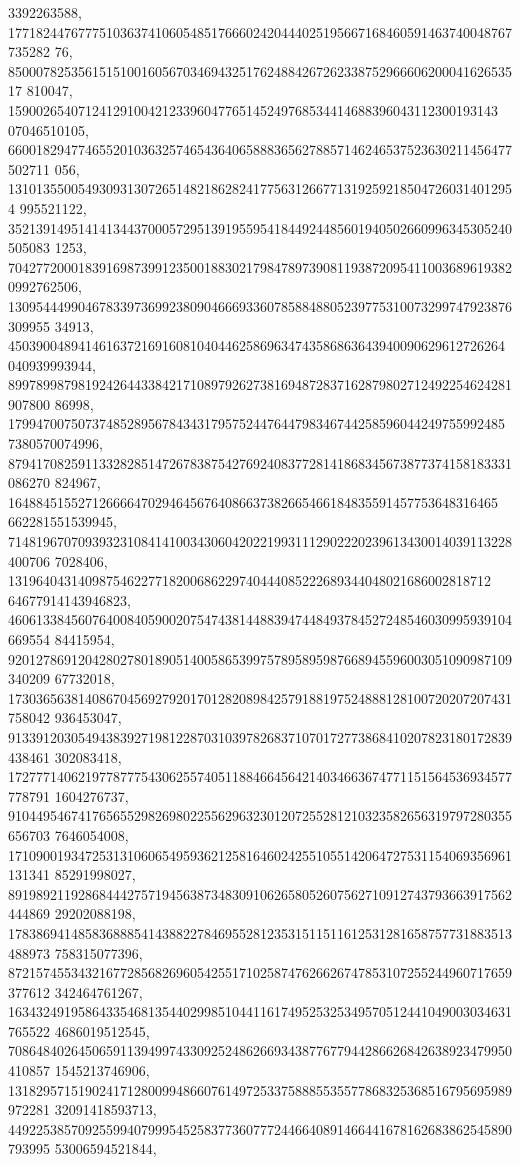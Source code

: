 \documentclass[12pt]{article}
\begin{document}
3392263588, 
177182447677751036374106054851766602420444025195667168460591463740048767735282
76, 85000782535615151001605670346943251762488426726233875296660620004162653517
810047, 1590026540712412910042123396047765145249768534414688396043112300193143
07046510105, 
660018294774655201036325746543640658883656278857146246537523630211456477502711
056, 1310135500549309313072651482186282417756312667713192592185047260314012954
995521122, 
352139149514141344370005729513919559541844924485601940502660996345305240505083
1253, 704277200018391698739912350018830217984789739081193872095411003689619382
0992762506, 
130954449904678339736992380904666933607858848805239775310073299747923876309955
34913, 45039004894146163721691608104044625869634743586863643940090629612726264
040939993944, 
899789987981924264433842171089792627381694872837162879802712492254624281907800
86998, 17994700750737485289567843431795752447644798346744258596044249755992485
7380570074996, 
879417082591133282851472678387542769240837728141868345673877374158183331086270
824967, 1648845155271266664702946456764086637382665466184835591457753648316465
662281551539945, 
714819670709393231084141003430604202219931112902220239613430014039113228400706
7028406, 131964043140987546227718200686229740444085222689344048021686002818712
64677914143946823, 
460613384560764008405900207547438144883947448493784527248546030995939104669554
84415954, 
920127869120428027801890514005865399757895895987668945596003051090987109340209
67732018, 
173036563814086704569279201701282089842579188197524888128100720207207431758042
936453047, 
913391203054943839271981228703103978268371070172773868410207823180172839438461
302083418, 
172777140621977877754306255740511884664564214034663674771151564536934577778791
1604276737, 
910449546741765655298269802255629632301207255281210323582656319797280355656703
7646054008, 
171090019347253131060654959362125816460242551055142064727531154069356961131341
85291998027, 
891989211928684442757194563873483091062658052607562710912743793663917562444869
29202088198, 
178386941485836888541438822784695528123531511511612531281658757731883513488973
758315077396, 
872157455343216772856826960542551710258747626626747853107255244960717659377612
342464761267, 
163432491958643354681354402998510441161749525325349570512441049003034631765522
4686019512545, 
708648402645065911394997433092524862669343877677944286626842638923479950410857
1545213746906, 
131829571519024171280099486607614972533758885535577868325368516795695989972281
32091418593713, 
449225385709255994079995452583773607772446640891466441678162683862545890793995
53006594521844, 
\end{document}
